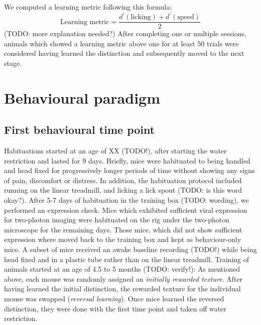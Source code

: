 We computed a learning metric following this formula:
\begin{equation}
\text{Learning metric} = \frac{d^{\prime}(\text{licking}) + d^{\prime}(\text{speed})}{2}
\end{equation}
(TODO: more explanation needed?)
After completing one or multiple sessions, animals which showed a learning metric above one for at least 50 trials were considered having learned the distinction and subsequently moved to the next stage.
\section{Behavioural paradigm}
\subsection{First behavioural time point}
Habituations started at an age of XX (TODO!), after starting the water restriction and lasted for 9 days. Briefly, mice were habituated to being handled and head fixed for progressively longer periods of time without showing any signs of pain, discomfort or distress. In addition, the habituation protocol included running on the linear treadmill, and licking a lick spout (TODO: is this word okay?). After 5-7 days of habituation in the training box (TODO: wording), we performed an expression check. Mice which exhibited sufficient viral expression for two-photon imaging were habituated on the rig under the two-photon microscope for the remaining days. Those mice, which did not show sufficient expression where moved back to the training box and kept as behaviour-only mice.
A subset of mice received an awake baseline recording (TODO!) while being head fixed and in a plastic tube rather than on the linear treadmill.
Training of animals started at an age of 4.5 to 5 months (TODO: verify!): As mentioned above, each mouse was randomly assigned an \textit{initially rewarded texture}. After having learned the initial distinction, the rewarded texture for the individual mouse was swapped (\textit{reversal learning}). Once mice learned the reversed distinction, they were done with the first time point and taken off water restriction.
